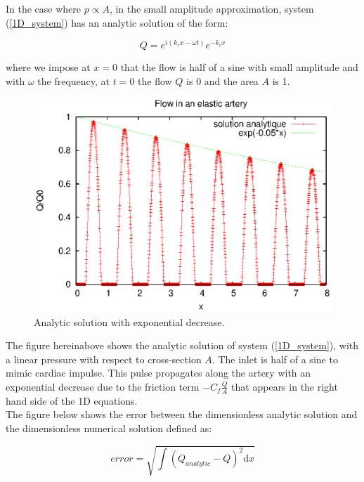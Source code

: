 \documentclass{config}
\begin{document}
In the case where $ p \propto A $, in the small amplitude approximation, system (\ref{1D_system}) has an analytic solution of the form:

\begin{equation}
Q =e^{i (k_r x - \omega t)} e^{-k_i x}
\end{equation}

where we impose at $x=0 $ that the flow is half of a sine with small amplitude and with $\omega$ the frequency, at $t=0$ the flow $Q$ is 0 and the area $A$ is 1.

\begin{figure}[H]
\begin{center}
\includegraphics[scale=1]{figures/Q_analytic.eps}
\caption{Analytic solution with exponential decrease.}
\label{Q_analytic}
\end{center}
\end{figure}

The figure hereinabove shows the analytic solution of system (\ref{1D_system}), with a linear pressure with respect to cross-section $A$. The inlet is half of a sine to mimic cardiac impulse. This pulse propagates along the artery with an exponential decrease due to the friction term $\displaystyle -C_f \frac{Q}{A}$ that appears in the right hand side of the 1D equations.  \\ 

The figure below shows the error between the dimensionless analytic solution and the dimensionless numerical solution defined as:

\begin{equation}\label{def_error}
error =\sqrt{ \int (Q_{analytic} - Q )^2 \mathrm{d}x }
\end{equation}
\end{document}
